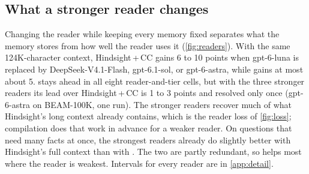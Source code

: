 \begin{table}[t]
\centering
\small
\caption{LongMemEval-S development set (62 questions, minimal prompt, mean of three runs, gpt-6-luna judge).
Differences are \method{} minus the baseline, with 95\% paired bootstrap intervals over questions.}
\label{tab:lme}
\setlength{\tabcolsep}{4pt}
\end{table}

\subsection{What a stronger reader changes}
\label{sec:reader}
Changing the reader while keeping every memory fixed separates what the memory stores from how well the reader uses
it (\cref{fig:readers}). With the same 124K-character context, Hindsight\,+\,CC gains 6 to 10 points when gpt-6-luna
is replaced by DeepSeek-V4.1-Flash, gpt-6.1-sol, or gpt-6-astra, while \method{} gains at most about 5. \method{} stays
ahead in all eight reader-and-tier cells, but with the three stronger readers its lead over Hindsight\,+\,CC is 1 to 3
points and resolved only once (gpt-6-astra on BEAM-100K, one run). The stronger readers recover much of what Hindsight's long context
already contains, which is the reader loss of \cref{fig:loss}; compilation does that work in advance for a weaker
reader. On questions that need many facts at once, the strongest readers already do slightly better with Hindsight's
full context than with \method{}. The two are partly redundant, so \method{} helps most where the reader is weakest.
Intervals for every reader are in \cref{app:detail}.


